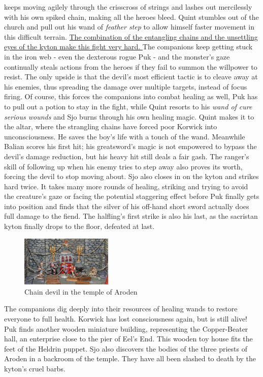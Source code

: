 keeps moving agilely through the crisscross of strings and lashes out mercilessly with his own spiked chain, making all the heroes bleed. Quint stumbles out of the church and pull out his wand of  {\itshape feather step} to allow himself faster movement in this difficult terrain. \hyperref[fig:Chain-devil-in-the-temple-of-Aroden-555419466]{ The combination of the entangling chains and the unsettling eyes of the kyton make this fight very hard. } The companions keep getting stuck in the iron web - even the dexterous rogue Puk - and the monster's gaze continually steals actions from the heroes if they fail to summon the willpower to resist. The only upside is that the devil's most efficient tactic is to cleave away at his enemies, thus spreading the damage over multiple targets, instead of focus firing. Of course, this forces the companions into combat healing as well, Puk has to pull out a potion to stay in the fight, while Quint resorts to his  {\itshape wand of cure serious wounds} and Sjo burns through his own healing magic. Quint makes it to the altar, where the strangling chains have forced poor Korwick into unconsciousness. He saves the boy's life with a touch of the wand. Meanwhile Balian scores his first hit; his greatsword's magic is not empowered to bypass the devil's damage reduction, but his heavy hit still deals a fair gash. The ranger's skill of following up when his enemy tries to step away also proves its worth, forcing the devil to stop moving about. Sjo also closes in on the kyton and strikes hard twice. It takes many more rounds of healing, striking and trying to avoid the creature's gaze or facing the potential staggering effect before Puk finally gets into position and finds that the silver of his off-hand short sword actually does full damage to the fiend. The halfling's first strike is also his last, as the sacristan kyton finally drops to the floor, defeated at last. \\

\begin{figure}[h]
	\centering
	\includegraphics[width=0.39\textwidth]{images/Chain-devil-in-the-temple-of-Aroden-555419466.jpg}
	\caption{Chain devil in the temple of Aroden}
	\label{fig:Chain-devil-in-the-temple-of-Aroden-555419466}
\end{figure}

The companions dig deeply into their resources of healing wands to restore everyone to full health. Korwick has lost consciousness again, but is still alive! Puk finds another wooden miniature building, representing the Copper-Beater hall, an enterprise close to the pier of Eel's End. This wooden toy house fits the feet of the Heldrin puppet. Sjo also discovers the bodies of the three priests of Aroden in a backroom of the temple. They have all been slashed to death by the kyton's cruel barbs.\\

